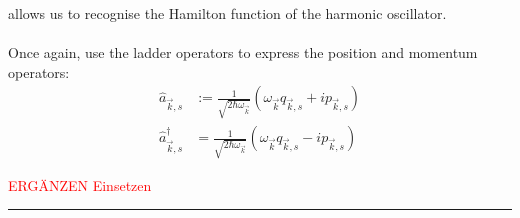 \documentclass{article}
\newcommand{\lr}[1]{\left(#1\right)}
\begin{document}
{	allows us to recognise the Hamilton function of the harmonic oscillator.\\
	\\
	Once again, use the ladder operators to express the position and momentum operators:
		\begin{align*}
			\hat{a}_{\vec{k},s} &:= \frac{1}{ \sqrt{2\hbar\omega_{\vec{k}}} } \lr{ \omega_{\vec{k}} q_{\vec{k},s} + i p_{\vec{k},s} } \\
			\hat{a}^\dagger_{\vec{k},s} &= \frac{1}{ \sqrt{2\hbar\omega_{\vec{k}}} } \lr{ \omega_{\vec{k}} q_{\vec{k},s} - i p_{\vec{k},s} }
		\end{align*}

	\textcolor{red}{ERGÄNZEN Einsetzen}\\
\hrule
}


\newpage
\end{document}
